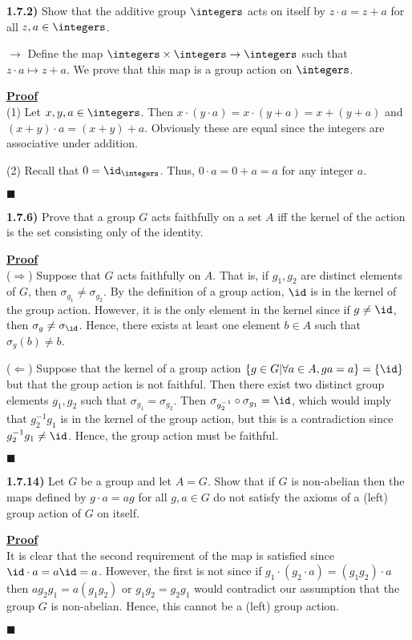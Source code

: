 \documentclass[12pt,a4paper]{article}
\newcommand{\prob}[2]{\textbf{#1)} #2}
\newenvironment{proof}
{
\textbf{\underline{Proof}} \\
}
{
\begin{flushright}
$\blacksquare$
\end{flushright}}
\begin{document}
\prob{1.7.2}{Show that the additive group $\integers$ acts on itself by $z \cdot a = z + a$ for all $z,a \in \integers$.}

$\rightarrow$ Define the map $\integers \times \integers \rightarrow \integers$ such that $z \cdot a \mapsto z + a$. We prove that this map is a group action on $\integers$.

\begin{proof}
(1) Let $x,y,a \in \integers$. Then $x \cdot (y \cdot a) = x \cdot (y + a) = x + (y + a)$ and $(x + y) \cdot a = (x + y) + a$. Obviously these are equal since the integers are associative under addition.

(2) Recall that $0 = \id_{\integers}$. Thus, $0 \cdot a = 0 + a = a$ for any integer $a$.
\end{proof}

\prob{1.7.6}{Prove that a group $G$ acts faithfully on a set $A$ iff the kernel of the action is the set consisting only of the identity.}

\begin{proof}
($\Rightarrow$) Suppose that $G$ acts faithfully on $A$. That is, if $g_1,g_2$ are distinct elements of $G$, then $\sigma_{g_1} \not= \sigma_{g_2}$. By the definition of a group action, $\id$ is in the kernel of the group action. However, it is the only element in the kernel since if $g \not= \id$, then $\sigma_{g} \not= \sigma_{\id}$. Hence, there exists at least one element $b \in A$ such that $\sigma_g(b) \not= b$.

($\Leftarrow$) Suppose that the kernel of a group action $\{g \in G | \forall a \in A, ga = a\} = \{\id\}$ but that the group action is not faithful. Then there exist two distinct group elements $g_1,g_2$ such that $\sigma_{g_1} = \sigma_{g_2}$. Then $\sigma_{g_2^{-1}} \circ \sigma_{g_1} = \id$, which would imply that $g_2^{-1}g_1$ is in the kernel of the group action, but this is a contradiction since $g_2^{-1}g_1 \not= \id$. Hence, the group action must be faithful.
\end{proof}

\prob{1.7.14}{Let $G$ be a group and let $A = G$. Show that if $G$ is non-abelian then the maps defined by $g \cdot a = ag$ for all $g,a \in G$ do not satisfy the axioms of a (left) group action of $G$ on itself.}

\begin{proof}
It is clear that the second requirement of the map is satisfied since $\id \cdot a = a\id = a$. However, the first is not since if $g_1 \cdot (g_2 \cdot a) = (g_1g_2) \cdot a$ then $ag_2g_1 = a(g_1g_2)$ or $g_1g_2 = g_2g_1$ would contradict our assumption that the group $G$ is non-abelian. Hence, this cannot be a (left) group action.
\end{proof}
\end{document}
